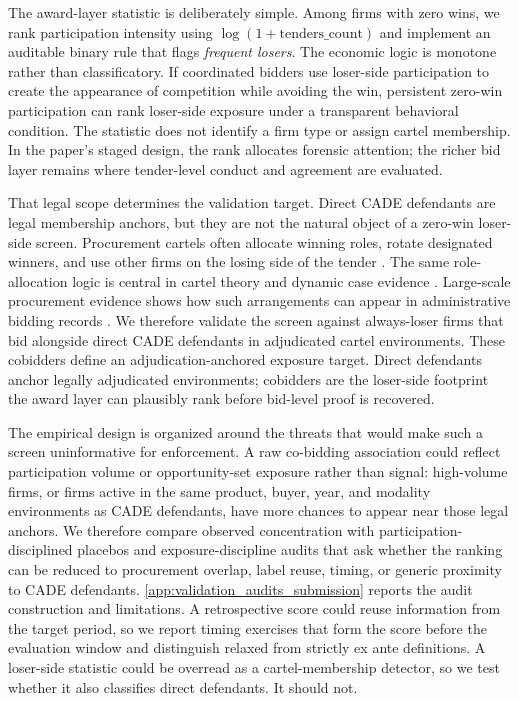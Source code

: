 The award-layer statistic is deliberately simple. Among firms
with zero wins, we rank participation intensity using
$\log(1+\text{tenders\_count})$ and implement an auditable
binary rule that flags \emph{frequent losers}. The economic
logic is monotone rather than classificatory. If coordinated
bidders use loser-side participation to create the appearance of
competition while avoiding the win, persistent zero-win
participation can rank loser-side exposure under a transparent
behavioral condition. The statistic does not identify a firm
type or assign cartel membership. In the paper's staged design,
the rank allocates forensic attention; the richer bid layer
remains where tender-level conduct and agreement are evaluated.

That legal scope determines the validation target. Direct CADE
defendants are legal membership anchors, but they are not the
natural object of a zero-win loser-side screen. Procurement
cartels often allocate winning roles, rotate designated
winners, and use other firms on the losing side of the tender
\citep{pesendorfer2000study,asker2010leniency}. The same
role-allocation logic is central in cartel theory and dynamic
case evidence \citep{marshall2012economics,clark2021collusion}.
Large-scale
procurement evidence shows how such arrangements can appear in
administrative bidding records \citep{kawai2022detecting}.
We therefore
validate the screen against always-loser firms that bid
alongside direct CADE defendants in adjudicated cartel
environments. These cobidders define an adjudication-anchored
exposure target. Direct defendants anchor legally adjudicated
environments; cobidders are the loser-side footprint the award
layer can plausibly rank before bid-level proof is recovered.

The empirical design is organized around the threats that would
make such a screen uninformative for enforcement. A raw
co-bidding association could reflect participation volume or
opportunity-set exposure rather than signal: high-volume firms,
or firms active in the same product, buyer, year, and modality
environments as CADE defendants, have more chances to appear
near those legal anchors. We therefore compare observed
concentration with participation-disciplined placebos and
exposure-discipline audits that ask whether the ranking can be
reduced to procurement overlap, label reuse, timing, or generic
proximity to CADE defendants. \ref{app:validation_audits_submission}
reports the audit construction and limitations. A
retrospective score could reuse information from the target
period, so we report timing exercises that form the score before
the evaluation window and distinguish relaxed from strictly ex
ante definitions. A loser-side statistic could be overread as a
cartel-membership detector, so we test whether it also
classifies direct defendants. It should not.

